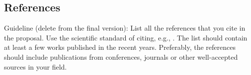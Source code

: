 \documentclass[a4paper, 12pt]{article}
\begin{document}
\subsection{References}
\label{literatura}


Guideline (delete from the final version):
List all the references that you cite in the proposal. Use the scientific standard of citing, e.g.,
\cite{Zivkovic2004}. The list should contain at least a few works published in the recent years. Preferably, the references should include publications from conferences, journals or other well-accepted sources in your field.

\renewcommand\refname{}
\vspace{-50px}






%
\end{document}
